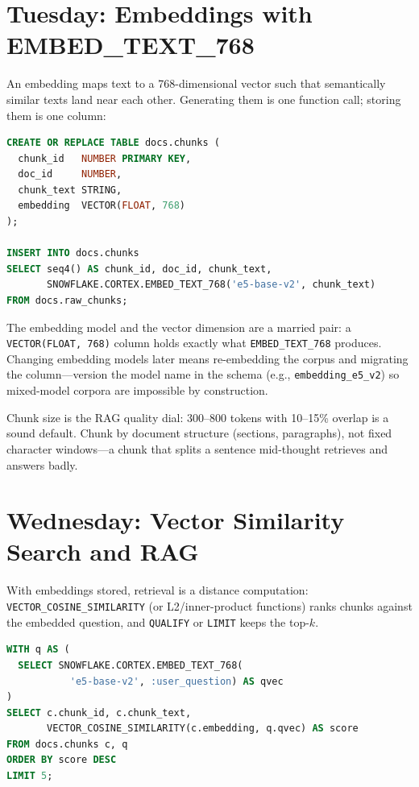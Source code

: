 \section{Tuesday: Embeddings with EMBED\_TEXT\_768}
An embedding maps text to a 768-dimensional vector such that semantically similar texts land near each other. Generating them is one function call; storing them is one column:

\begin{lstlisting}[language=SQL, caption={Generating and storing embeddings}]
CREATE OR REPLACE TABLE docs.chunks (
  chunk_id   NUMBER PRIMARY KEY,
  doc_id     NUMBER,
  chunk_text STRING,
  embedding  VECTOR(FLOAT, 768)
);

INSERT INTO docs.chunks
SELECT seq4() AS chunk_id, doc_id, chunk_text,
       SNOWFLAKE.CORTEX.EMBED_TEXT_768('e5-base-v2', chunk_text)
FROM docs.raw_chunks;
\end{lstlisting}

The embedding model and the vector dimension are a married pair: a \texttt{VECTOR(FLOAT, 768)} column holds exactly what \texttt{EMBED\_TEXT\_768} produces. Changing embedding models later means re-embedding the corpus and migrating the column---version the model name in the schema (e.g., \texttt{embedding\_e5\_v2}) so mixed-model corpora are impossible by construction.

\begin{tipbox}
Chunk size is the RAG quality dial: 300--800 tokens with 10--15\% overlap is a sound default. Chunk by document structure (sections, paragraphs), not fixed character windows---a chunk that splits a sentence mid-thought retrieves and answers badly.
\end{tipbox}

\section{Wednesday: Vector Similarity Search and RAG}
With embeddings stored, retrieval is a distance computation: \texttt{VECTOR\_COSINE\_SIMILARITY} (or L2/inner-product functions) ranks chunks against the embedded question, and \texttt{QUALIFY} or \texttt{LIMIT} keeps the top-$k$.

\begin{lstlisting}[language=SQL, caption={Retrieval: top-k chunks for a question}]
WITH q AS (
  SELECT SNOWFLAKE.CORTEX.EMBED_TEXT_768(
           'e5-base-v2', :user_question) AS qvec
)
SELECT c.chunk_id, c.chunk_text,
       VECTOR_COSINE_SIMILARITY(c.embedding, q.qvec) AS score
FROM docs.chunks c, q
ORDER BY score DESC
LIMIT 5;
\end{lstlisting}

